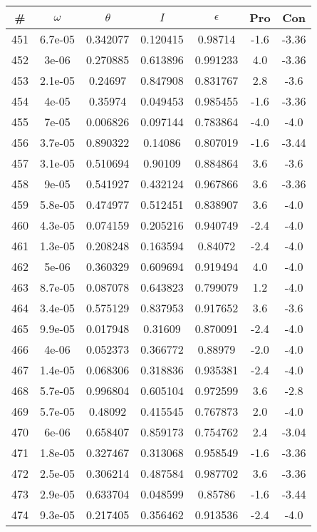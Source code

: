 \begin{table}
\begin{tabular}{c|c|c|c|c|c|c}
\# & $\omega$ & $\theta$ & $I$ & $\epsilon$ & Pro & Con\\
\hline
451 & 6.7e-05 & 0.342077 & 0.120415 & 0.98714 & -1.6 & -3.36\\
452 & 3e-06 & 0.270885 & 0.613896 & 0.991233 & 4.0 & -3.36\\
453 & 2.1e-05 & 0.24697 & 0.847908 & 0.831767 & 2.8 & -3.6\\
454 & 4e-05 & 0.35974 & 0.049453 & 0.985455 & -1.6 & -3.36\\
455 & 7e-05 & 0.006826 & 0.097144 & 0.783864 & -4.0 & -4.0\\
456 & 3.7e-05 & 0.890322 & 0.14086 & 0.807019 & -1.6 & -3.44\\
457 & 3.1e-05 & 0.510694 & 0.90109 & 0.884864 & 3.6 & -3.6\\
458 & 9e-05 & 0.541927 & 0.432124 & 0.967866 & 3.6 & -3.36\\
459 & 5.8e-05 & 0.474977 & 0.512451 & 0.838907 & 3.6 & -4.0\\
460 & 4.3e-05 & 0.074159 & 0.205216 & 0.940749 & -2.4 & -4.0\\
461 & 1.3e-05 & 0.208248 & 0.163594 & 0.84072 & -2.4 & -4.0\\
462 & 5e-06 & 0.360329 & 0.609694 & 0.919494 & 4.0 & -4.0\\
463 & 8.7e-05 & 0.087078 & 0.643823 & 0.799079 & 1.2 & -4.0\\
464 & 3.4e-05 & 0.575129 & 0.837953 & 0.917652 & 3.6 & -3.6\\
465 & 9.9e-05 & 0.017948 & 0.31609 & 0.870091 & -2.4 & -4.0\\
466 & 4e-06 & 0.052373 & 0.366772 & 0.88979 & -2.0 & -4.0\\
467 & 1.4e-05 & 0.068306 & 0.318836 & 0.935381 & -2.4 & -4.0\\
468 & 5.7e-05 & 0.996804 & 0.605104 & 0.972599 & 3.6 & -2.8\\
469 & 5.7e-05 & 0.48092 & 0.415545 & 0.767873 & 2.0 & -4.0\\
470 & 6e-06 & 0.658407 & 0.859173 & 0.754762 & 2.4 & -3.04\\
471 & 1.8e-05 & 0.327467 & 0.313068 & 0.958549 & -1.6 & -3.36\\
472 & 2.5e-05 & 0.306214 & 0.487584 & 0.987702 & 3.6 & -3.36\\
473 & 2.9e-05 & 0.633704 & 0.048599 & 0.85786 & -1.6 & -3.44\\
474 & 9.3e-05 & 0.217405 & 0.356462 & 0.913536 & -2.4 & -4.0\\

\end{tabular}
\end{table}
